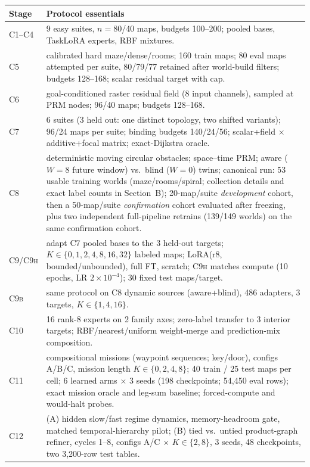 \documentclass[letterpaper]{article} %
\newcommand{\stage}[1]{\textsc{#1}}
\begin{document}
\begin{table}[t]
\centering
\small
\begin{tabular}{@{}lp{14.2cm}@{}}
\toprule
Stage & Protocol essentials \\
\midrule
\stage{C1--C4} & 9 easy suites, $n{=}80$/40 maps, budgets 100--200; pooled bases, TaskLoRA experts, RBF mixtures. \\
\stage{C5} & calibrated hard maze/dense/rooms; 160 train maps; 80 eval maps attempted per suite, 80/79/77 retained after world-build filters; budgets 128--168; scalar residual target with cap. \\
\stage{C6} & goal-conditioned raster residual field (8 input channels), sampled at PRM nodes; 96/40 maps; budgets 128--168. \\
\stage{C7} & 6 suites (3 held out: one distinct topology, two shifted variants); 96/24 maps per suite; binding budgets 140/24/56; scalar+field $\times$ additive+focal matrix; exact-Dijkstra oracle. \\
\stage{C8} & deterministic moving circular obstacles; space--time PRM; aware ($W{=}8$ future window) vs.\ blind ($W{=}0$) twins; canonical run: 53 usable training worlds (maze/rooms/spiral; collection details and exact label counts in Section~B); 20-map/suite \emph{development} cohort, then a 50-map/suite \emph{confirmation} cohort evaluated after freezing, plus two independent full-pipeline retrains (139/149 worlds) on the same confirmation cohort. \\
\stage{C9/C9h} & adapt \stage{C7} pooled bases to the 3 held-out targets; $K \in \{0, 1, 2, 4, 8, 16, 32\}$ labeled maps; LoRA(r8, bounded/unbounded), full FT, scratch; \stage{C9h} matches compute (10 epochs, LR $2{\times}10^{-4}$); 30 fixed test maps/target. \\
\stage{C9b} & same protocol on \stage{C8} dynamic sources (aware+blind), 486 adapters, 3 targets, $K\in\{1,4,16\}$. \\
\stage{C10} & 16 rank-8 experts on 2 family axes; zero-label transfer to 3 interior targets; RBF/nearest/uniform weight-merge and prediction-mix composition. \\
\stage{C11} & compositional missions (waypoint sequences; key/door), configs A/B/C, mission length $K\in\{0,2,4,8\}$; 40 train / 25 test maps per cell; 6 learned arms $\times$ 3 seeds (198 checkpoints; 54{,}450 eval rows); exact mission oracle and leg-sum baseline; forced-compute and would-halt probes. \\
\stage{C12} & (A) hidden slow/fast regime dynamics, memory-headroom gate, matched temporal-hierarchy pilot; (B) tied vs.\ untied product-graph refiner, cycles 1--8, configs A/C $\times$ $K\in\{2,8\}$, 3 seeds, 48 checkpoints, two 3{,}200-row test tables. \\

\end{tabular}
\end{table}
\end{document}
